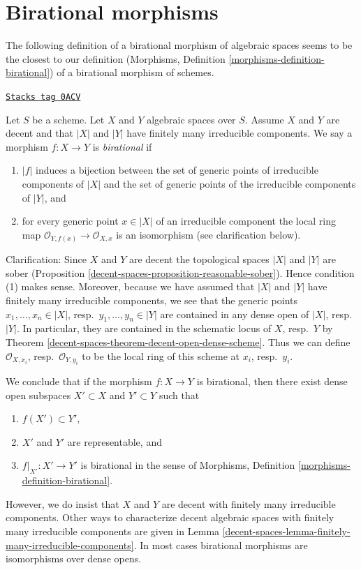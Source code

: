 \section{Birational morphisms}
\label{decent-spaces-section-birational}
The following definition of a birational morphism of algebraic spaces
seems to be the closest to our definition
(Morphisms, Definition \ref{morphisms-definition-birational})
of a birational morphism of schemes.

\begin{definition}[Birational]
\label{decent-spaces-definition-birational}
\href{https://stacks.math.columbia.edu/tag/0ACV}{\texttt{Stacks tag 0ACV}}

Let $S$ be a scheme. Let $X$ and $Y$ algebraic spaces over $S$.
Assume $X$ and $Y$ are decent and that $|X|$ and $|Y|$ have finitely many
irreducible components. We say a morphism $f : X \to Y$ is
{\it birational} if
\begin{enumerate}
\item $|f|$ induces a bijection between the set of generic points
of irreducible components of $|X|$ and the set of generic points
of the irreducible components of $|Y|$, and
\item for every generic point $x \in |X|$ of an irreducible component
the local ring map $\mathcal{O}_{Y, f(x)} \to \mathcal{O}_{X, x}$
is an isomorphism (see clarification below).
\end{enumerate}
\end{definition}

Clarification: Since $X$ and $Y$ are decent the topological spaces
$|X|$ and $|Y|$ are sober (Proposition \ref{decent-spaces-proposition-reasonable-sober}).
Hence condition (1) makes sense. Moreover, because we have assumed
that $|X|$ and $|Y|$ have finitely many irreducible components, we
see that the generic points $x_1, \ldots, x_n \in |X|$,
resp.\ $y_1, \ldots, y_n \in |Y|$ are contained in any dense open
of $|X|$, resp.\ $|Y|$. In particular, they are contained in
the schematic locus of $X$, resp.\ $Y$ by
Theorem \ref{decent-spaces-theorem-decent-open-dense-scheme}.
Thus we can define $\mathcal{O}_{X, x_i}$, resp.\ $\mathcal{O}_{Y, y_i}$
to be the local ring of this scheme at $x_i$, resp.\ $y_i$.

\medskip\noindent
We conclude that if the morphism $f : X \to Y$ is birational, then
there exist dense open subspaces $X' \subset X$ and $Y' \subset Y$ such that
\begin{enumerate}
\item $f(X') \subset Y'$,
\item $X'$ and $Y'$ are representable, and
\item $f|_{X'} : X' \to Y'$ is birational in
the sense of Morphisms, Definition \ref{morphisms-definition-birational}.
\end{enumerate}
However, we do insist that $X$ and $Y$ are decent with finitely many
irreducible components. Other ways to characterize decent algebraic spaces
with finitely many irreducible components
are given in Lemma \ref{decent-spaces-lemma-finitely-many-irreducible-components}.
In most cases birational morphisms are isomorphisms over dense opens.

